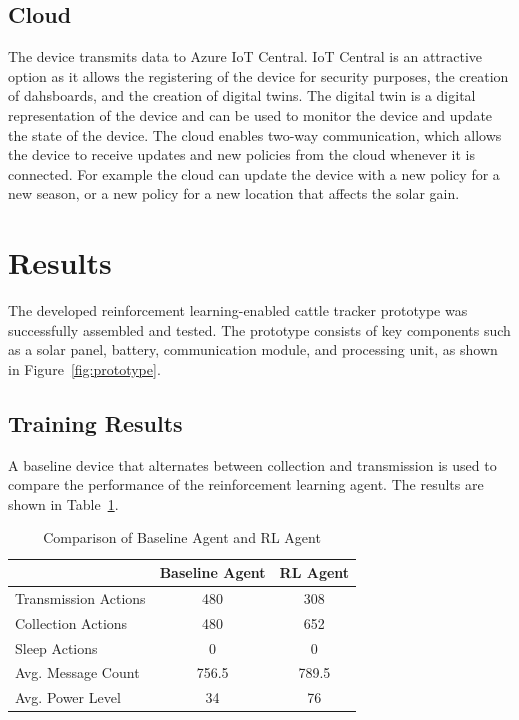 \documentclass[10pt]{cai}
\begin{document}
\subsection{Cloud}
The device transmits data to Azure IoT Central.
IoT Central is an attractive option as it allows the registering of the device for security purposes, the creation of dahsboards, and the creation of digital twins.
The digital twin is a digital representation of the device and can be used to monitor the device and update the state of the device.
The cloud enables two-way communication, which allows the device to receive updates and new policies from the cloud whenever it is connected.
For example the cloud can update the device with a new policy for a new season, or a new policy for a new location that affects the solar gain.


\section{Results}
The developed reinforcement learning-enabled cattle tracker prototype was successfully assembled and tested. 
The prototype consists of key components such as a solar panel, battery, communication module, and processing unit, as shown in Figure~\ref{fig:prototype}.

\subsection{Training Results}
A baseline device that alternates between collection and transmission is used to compare the performance of the reinforcement learning agent.
The results are shown in Table~\ref{tab:agent_comparison}.

\begin{table}[h]
  \centering
  \begin{tabular}{lcc}
      \toprule
      & Baseline Agent & RL Agent \\
      \midrule
      Transmission Actions & 480 & 308 \\
      Collection Actions & 480 & 652 \\
      Sleep Actions & 0 & 0 \\
      Avg. Message Count & 756.5 & 789.5 \\
      Avg. Power Level & 34 & 76 \\
      \bottomrule
  \end{tabular}
  \caption{Comparison of Baseline Agent and RL Agent}
  \label{tab:agent_comparison}
\end{table}
\end{document}
